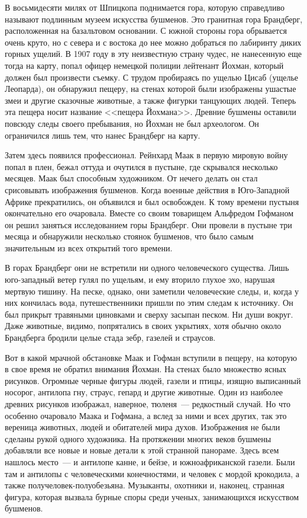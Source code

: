 \documentclass[12pt,a4paper,twoside,openany,svgnames]{memoir}
\begin{document}
В восьмидесяти милях от Шпицкопа поднимается гора, которую справедливо называют подлинным музеем искусства бушменов. Это гранитная гора Брандберг, расположенная на базальтовом основании. С южной стороны гора обрывается очень круто, но с севера и с востока до нее можно добраться по лабиринту диких горных ущелий. В 1907 году в эту неизвестную страну чудес, не нанесенную еще тогда на карту, попал офицер немецкой полиции лейтенант Йохман, который должен был произвести съемку. С трудом пробираясь по ущелью Цисаб (ущелье Леопарда), он обнаружил пещеру, на стенах которой были изображены ушастые змеи и другие сказочные животные, а также фигурки танцующих людей. Теперь эта пещера носит название <<пещера Йохмана>>. Древние бушмены оставили повсюду следы своего пребывания, но Йохман не был археологом. Он ограничился лишь тем, что нанес Брандберг на карту.

Затем здесь появился профессионал. Рейнхард Маак в первую мировую войну попал в плен, бежал оттуда и очутился в пустыне, где скрывался несколько месяцев. Маак был способным художником. От нечего делать он стал срисовывать изображения бушменов. Когда военные действия в Юго-Западной Африке прекратились, он объявился и был освобожден. К тому времени пустыня окончательно его очаровала. Вместе со своим товарищем Альфредом Гофманом он решил заняться исследованием горы Брандберг. Они провели в пустыне три месяца и обнаружили несколько стоянок бушменов, что было самым значительным из всех открытий того времени.

В горах Брандберг они не встретили ни одного человеческого существа. Лишь юго-западный ветер гулял по ущельям, и ему вторило глухое эхо, нарушая мертвую тишину. На песке, однако, они заметили человеческие следы, и, когда у них кончилась вода, путешественники пришли по этим следам к источнику. Он был прикрыт травяными циновками и сверху засыпан песком. Ни души вокруг. Даже животные, видимо, попрятались в своих укрытиях, хотя обычно около Брандберга бродили целые стада зебр, газелей и страусов.

Вот в какой мрачной обстановке Маак и Гофман вступили в пещеру, на которую в свое время не обратил внимания Йохман. На стенах было множество ясных рисунков. Огромные черные фигуры людей, газели и птицы, изящно выписанный носорог, антилопа гну, страус, гепард и другие животные. Один из наиболее древних рисунков изображал, наверное, тюленя~--- редкостный случай. Но что особенно очаровало Маака и Гофмана, а вслед за ними и всех других, так это вереница животных, людей и обитателей мира духов. Изображения не были сделаны рукой одного художника. На протяжении многих веков бушмены добавляли все новые и новые детали к этой странной панораме. Здесь всем нашлось место~--- и антилопе канне, и бейзе, и южноафриканской газели. Были там и антилопы с человеческими конечностями, и человек с мордой крокодила, а также получеловек-полуобезьяна. Музыканты, охотники и, наконец, странная фигура, которая вызвала бурные споры среди ученых, занимающихся искусством бушменов.
\end{document}
